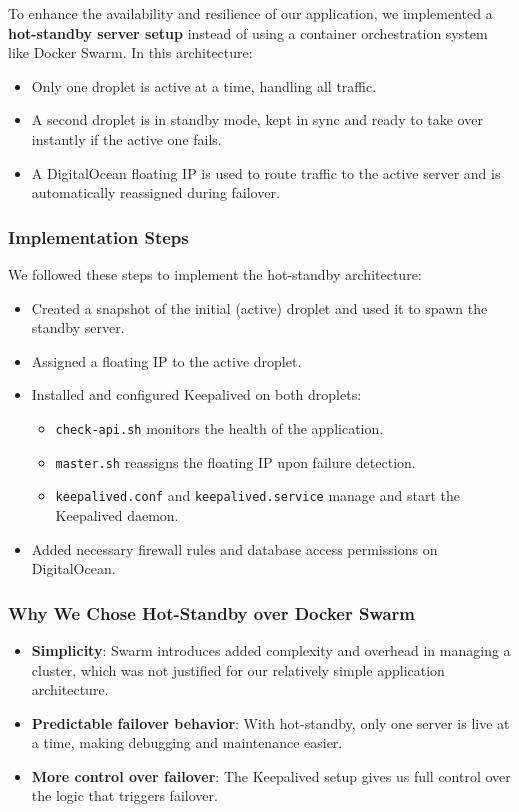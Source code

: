 To enhance the availability and resilience of our application, we implemented a \textbf{hot-standby server setup} instead of using a container orchestration system like Docker Swarm. In this architecture:
\begin{itemize}
  \item Only one droplet is active at a time, handling all traffic.
  \item A second droplet is in standby mode, kept in sync and ready to take over instantly if the active one fails.
  \item A DigitalOcean floating IP is used to route traffic to the active server and is automatically reassigned during failover.
\end{itemize}

\subsubsection*{Implementation Steps}
We followed these steps to implement the hot-standby architecture:
\begin{itemize}
  \item Created a snapshot of the initial (active) droplet and used it to spawn the standby server.
  \item Assigned a floating IP to the active droplet.
 \item Installed and configured Keepalived on both droplets:
    \begin{itemize}
      \item \texttt{check-api.sh} monitors the health of the application.
      \item \texttt{master.sh} reassigns the floating IP upon failure detection.
      \item \texttt{keepalived.conf} and \texttt{keepalived.service} manage and start the Keepalived daemon.
    \end{itemize}
  \item Added necessary firewall rules and database access permissions on DigitalOcean.
\end{itemize}

\subsubsection*{Why We Chose Hot-Standby over Docker Swarm}
\begin{itemize}
  \item \textbf{Simplicity}: Swarm introduces added complexity and overhead in managing a cluster, which was not justified for our relatively simple application architecture.
  \item \textbf{Predictable failover behavior}: With hot-standby, only one server is live at a time, making debugging and maintenance easier.
  \item \textbf{More control over failover}: The Keepalived setup gives us full control over the logic that triggers failover.
\end{itemize}

